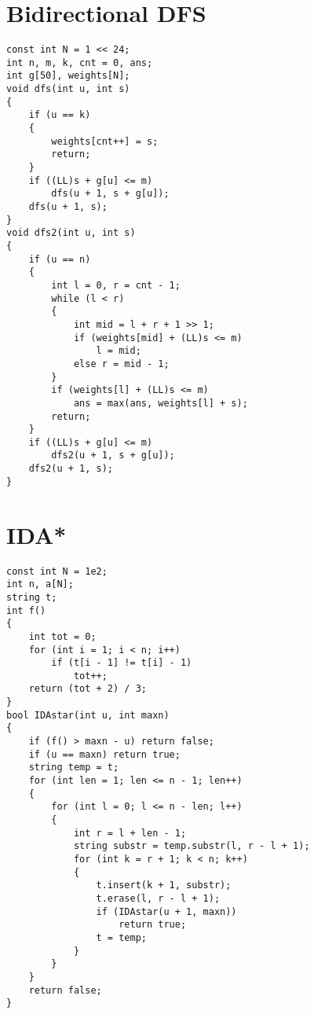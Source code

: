 \section{Bidirectional DFS}
\begin{lstlisting}
const int N = 1 << 24;
int n, m, k, cnt = 0, ans;
int g[50], weights[N];
void dfs(int u, int s)
{
    if (u == k)
    {
        weights[cnt++] = s;
        return;
    }
    if ((LL)s + g[u] <= m)
        dfs(u + 1, s + g[u]);
    dfs(u + 1, s);
}
void dfs2(int u, int s)
{
    if (u == n)
    {
        int l = 0, r = cnt - 1;
        while (l < r)
        {
            int mid = l + r + 1 >> 1;
            if (weights[mid] + (LL)s <= m)
                l = mid;
            else r = mid - 1;
        }
        if (weights[l] + (LL)s <= m)
            ans = max(ans, weights[l] + s);
        return;
    }
    if ((LL)s + g[u] <= m)
        dfs2(u + 1, s + g[u]);
    dfs2(u + 1, s);
}
\end{lstlisting}
\section{IDA*}
\begin{lstlisting}
const int N = 1e2;
int n, a[N];
string t;
int f()
{
    int tot = 0;
    for (int i = 1; i < n; i++)
        if (t[i - 1] != t[i] - 1)
            tot++;
    return (tot + 2) / 3;
}
bool IDAstar(int u, int maxn)
{
    if (f() > maxn - u) return false;
    if (u == maxn) return true;
    string temp = t;
    for (int len = 1; len <= n - 1; len++)
    {
        for (int l = 0; l <= n - len; l++)
        {
            int r = l + len - 1;
            string substr = temp.substr(l, r - l + 1);
            for (int k = r + 1; k < n; k++)
            {
                t.insert(k + 1, substr);
                t.erase(l, r - l + 1);
                if (IDAstar(u + 1, maxn))
                    return true;
                t = temp;
            }
        }
    }
    return false;
}
\end{lstlisting}